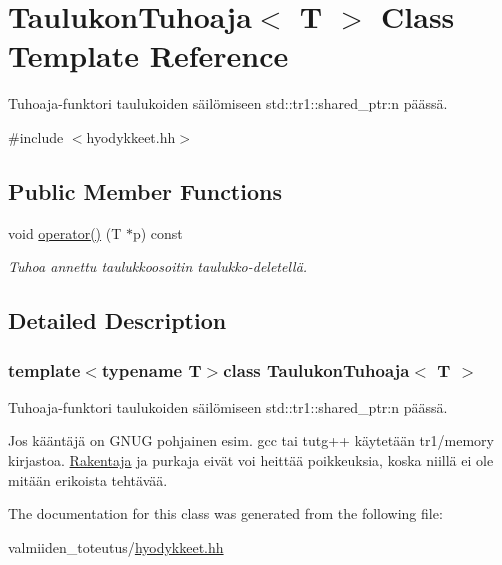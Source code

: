 \hypertarget{class_taulukon_tuhoaja}{}\section{Taulukon\+Tuhoaja$<$ T $>$ Class Template Reference}
\label{class_taulukon_tuhoaja}


Tuhoaja-\/funktori taulukoiden säilömiseen std\+::tr1\+::shared\+\_\+ptr\+:n päässä.  




{\ttfamily \#include $<$hyodykkeet.\+hh$>$}

\subsection*{Public Member Functions}
\begin{DoxyCompactItemize}
\item 
\hypertarget{class_taulukon_tuhoaja_a542ea354b21691344b2a9cf1fb09971e}{}void \hyperlink{class_taulukon_tuhoaja_a542ea354b21691344b2a9cf1fb09971e}{operator()} (T $\ast$p) const \label{class_taulukon_tuhoaja_a542ea354b21691344b2a9cf1fb09971e}

\begin{DoxyCompactList}\small\item\em Tuhoa annettu taulukkoosoitin taulukko-\/deletellä. \end{DoxyCompactList}\end{DoxyCompactItemize}


\subsection{Detailed Description}
\subsubsection*{template$<$typename T$>$class Taulukon\+Tuhoaja$<$ T $>$}

Tuhoaja-\/funktori taulukoiden säilömiseen std\+::tr1\+::shared\+\_\+ptr\+:n päässä. 

Jos kääntäjä on G\+N\+U\+G pohjainen esim. gcc tai tutg++ käytetään tr1/memory kirjastoa. \hyperlink{class_rakentaja}{Rakentaja} ja purkaja eivät voi heittää poikkeuksia, koska niillä ei ole mitään erikoista tehtävää. 

The documentation for this class was generated from the following file\+:\begin{DoxyCompactItemize}
\item 
valmiiden\+\_\+toteutus/\hyperlink{hyodykkeet_8hh}{hyodykkeet.\+hh}\end{DoxyCompactItemize}
